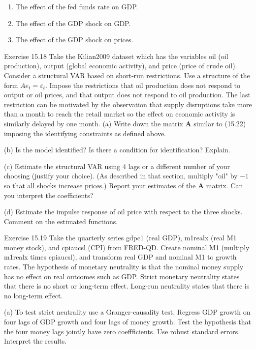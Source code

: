 \documentclass[10pt]{article}
\begin{document}
\begin{enumerate}
  \item The effect of the fed funds rate on GDP.

  \item The effect of the GDP shock on GDP.

  \item The effect of the GDP shock on prices.

\end{enumerate}
Exercise 15.18 Take the Kilian2009 dataset which has the variables oil (oil production), output (global economic activity), and price (price of crude oil). Consider a structural VAR based on short-run restrictions. Use a structure of the form $A e_{t}=\varepsilon_{t}$. Impose the restrictions that oil production does not respond to output or oil prices, and that output does not respond to oil production. The last restriction can be motivated by the observation that supply disruptions take more than a month to reach the retail market so the effect on economic activity is similarly delayed by one month. (a) Write down the matrix $\boldsymbol{A}$ similar to (15.22) imposing the identifying constraints as defined above.

(b) Is the model identified? Is there a condition for identification? Explain.

(c) Estimate the structural VAR using 4 lags or a different number of your choosing (justify your choice). (As described in that section, multiply "oil" by $-1$ so that all shocks increase prices.) Report your estimates of the $\boldsymbol{A}$ matrix. Can you interpret the coefficients?

(d) Estimate the impulse response of oil price with respect to the three shocks. Comment on the estimated functions.

Exercise 15.19 Take the quarterly series gdpc1 (real GDP), m1realx (real M1 money stock), and cpiaucsl (CPI) from FRED-QD. Create nominal M1 (multiply m1realx times cpiaucsl), and transform real GDP and nominal M1 to growth rates. The hypothesis of monetary neutrality is that the nominal money supply has no effect on real outcomes such as GDP. Strict monetary neutrality states that there is no short or long-term effect. Long-run neutrality states that there is no long-term effect.

(a) To test strict neutrality use a Granger-causality test. Regress GDP growth on four lags of GDP growth and four lags of money growth. Test the hypothesis that the four money lags jointly have zero coeffficients. Use robust standard errors. Interpret the results.
\end{document}

